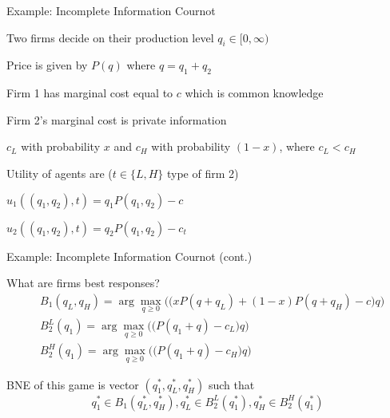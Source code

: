 \documentclass[11pt,aspectratio=169,handout]{beamer}
\begin{document}
  
  \begin{frame}{Example: Incomplete Information Cournot}
   \begin{itemizes}[0.7em]
    \item Two firms decide on their production level $q_i \in [0, \infty)$
    \item Price is given by $P(q)$ where $q = q_1 + q_2$
    \item Firm 1 has marginal cost equal to $c$ which is common knowledge
    \item Firm 2's marginal cost is private information
     \begin{itemizes}[0.5em]
      \item $c_L$ with probability $x$ and $c_H$ with probability $(1-x)$, where $c_L < c_H$
     \end{itemizes}
    \item Utility of agents are ($t \in \{L, H\}$ type of firm 2)
     \begin{itemizes}[0.5em]
      \item $u_1((q_1,q_2), t) = q_1 P (q_1, q_2)-c$
      \item $u_2((q_1,q_2), t) = q_2 P (q_1, q_2)-c_t$
     \end{itemizes}
   \end{itemizes}
  \end{frame}
  
  
  \begin{frame}{Example: Incomplete Information Cournot (cont.)}
   \begin{itemizes}
    \item What are firms best responses?
    \begin{align*}
     & B_1(q_L,q_H)=\arg\max_{q\ge 0} \Big(\big(xP(q+q_L)+(1-x)P(q+q_H) - c\big) q\Big) \\
     & B_2^L(q_1)=\arg\max_{q\ge 0} \Big(\big(P(q_1+q) - c_L\big) q\Big) \\
     & B_2^H(q_1)= \arg\max_{q\ge 0} \Big(\big(P(q_1+q) - c_H\big) q\Big)
    \end{align*}
    \item BNE of this game is vector $(q_1^*,q_L^*,q_H^* )$ such that
    \begin{equation*}
     q_1^*\in B_1(q_L^*,q_H^*), q_L^*\in B_2^L(q_1^*), q_H^*\in B_2^H(q_1^*)
    \end{equation*}
   \end{itemizes}
  \end{frame}
  
\end{document}
